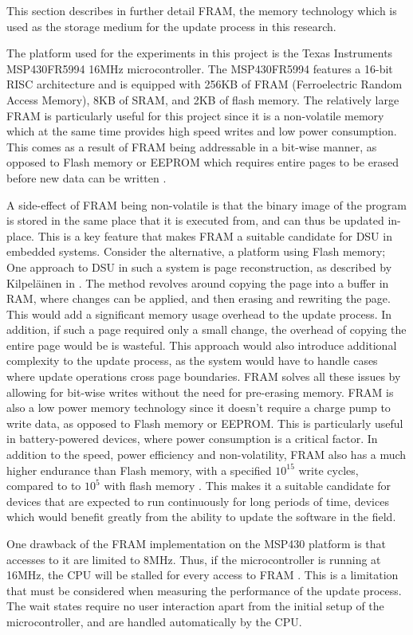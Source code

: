 This section describes in further detail FRAM, the memory technology which is used as the storage medium for the update process in this research. 

The platform used for the experiments in this project is the Texas Instruments MSP430FR5994 16MHz microcontroller. The MSP430FR5994 features a 16-bit RISC architecture and is equipped with 256KB of FRAM (Ferroelectric Random Access Memory), 8KB of SRAM, and 2KB of flash memory. The relatively large FRAM is particularly useful for this project since it is a non-volatile memory which at the same time provides high speed writes and low power consumption. This comes as a result of FRAM being addressable in a bit-wise manner, as opposed to Flash memory or EEPROM which requires entire pages to be erased before new data can be written \cite{framReport}. 

A side-effect of FRAM being non-volatile is that the binary image of the program is stored in the same place that it is executed from, and can thus be updated in-place. This is a key feature that makes FRAM a suitable candidate for DSU in embedded systems. Consider the alternative, a platform using Flash memory; One approach to DSU in such a system is page reconstruction, as described by Kilpeläinen in \cite{Kilpelainen2023}. The method revolves around copying the page into a buffer in RAM, where changes can be applied, and then erasing and rewriting the page. This would add a significant memory usage overhead to the update process. In addition, if such a page required only a small change, the overhead of copying the entire page would be is wasteful. This approach would also introduce additional complexity to the update process, as the system would have to handle cases where update operations cross page boundaries. FRAM solves all these issues by allowing for bit-wise writes without the need for pre-erasing memory. FRAM is also a low power memory technology since it doesn't require a charge pump to write data, as opposed to Flash memory or EEPROM. This is particularly useful in battery-powered devices, where power consumption is a critical factor. In addition to the speed, power efficiency and non-volatility, FRAM also has a much higher endurance than Flash memory, with a specified $10^{15}$ write cycles, compared to to $10^{5}$ with flash memory \cite{framReport}. This makes it a suitable candidate for devices that are expected to run continuously for long periods of time, devices which would benefit greatly from the ability to update the software in the field.

One drawback of the FRAM implementation on the MSP430 platform is that accesses to it are limited to 8MHz. Thus, if the microcontroller is running at 16MHz, the CPU will be stalled for every access to FRAM \cite{framReport}. This is a limitation that must be considered when measuring the performance of the update process. The wait states require no user interaction apart from the initial setup of the microcontroller, and are handled automatically by the CPU.
